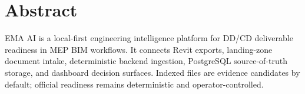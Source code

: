 \section*{Abstract}
EMA AI is a local-first engineering intelligence platform for DD/CD deliverable readiness in MEP BIM workflows. It connects Revit exports, landing-zone document intake, deterministic backend ingestion, PostgreSQL source-of-truth storage, and dashboard decision surfaces. Indexed files are evidence candidates by default; official readiness remains deterministic and operator-controlled.

